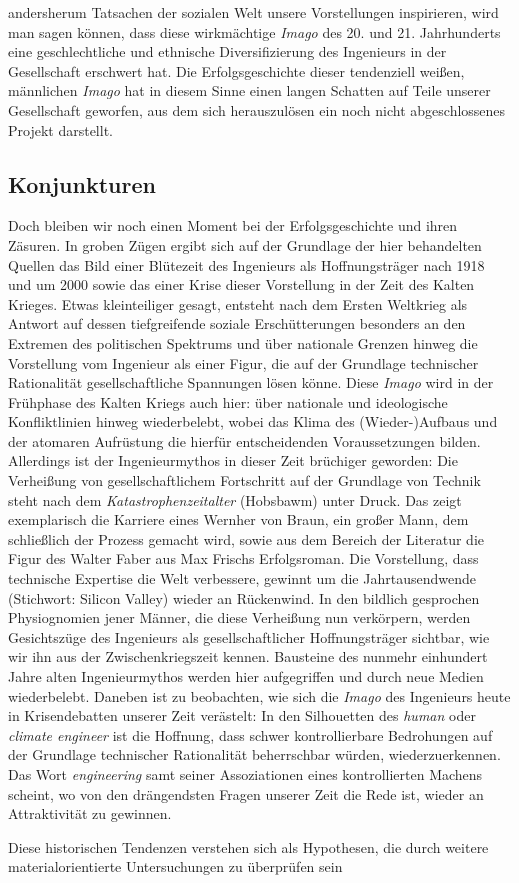\documentclass[%
	fontsize=10pt,%
	twoside,%
	headings=optiontoheadandtoc,%
	showtrims]{scrbook}
\renewcommand{\texttt}{\nohyphens} %
\begin{document}
andersherum Tatsachen der sozialen Welt unsere Vorstellungen inspirieren, wird man sagen können, dass diese wirkmächtige \emph{Imago} des 20. und 21. Jahrhunderts eine geschlechtliche und ethnische Diversifizierung des Ingenieurs in der Gesellschaft erschwert hat. Die Erfolgsgeschichte dieser tendenziell weißen, männlichen \emph{Imago} hat in diesem Sinne einen langen Schatten auf Teile unserer Gesellschaft geworfen, aus dem sich herauszulösen ein noch nicht abgeschlossenes Projekt darstellt.
\subsection[Konjunkturen]{Konjunkturen}
\par Doch bleiben wir noch einen Moment bei der Erfolgsgeschichte und ihren Zäsuren. In groben Zügen ergibt sich auf der Grundlage der hier behandelten Quellen das Bild einer Blütezeit des Ingenieurs als Hoffnungsträger nach 1918 und um 2000 sowie das einer Krise dieser Vorstellung in der Zeit des Kalten Krieges. Etwas kleinteiliger gesagt, entsteht nach dem Ersten Weltkrieg als Antwort auf dessen tiefgreifende soziale Erschütterungen besonders an den Extremen des politischen Spektrums und über nationale Grenzen hinweg die Vorstellung vom Ingenieur als einer Figur, die auf der Grundlage technischer Rationalität gesellschaftliche Spannungen lösen könne. Diese \emph{Imago} wird in der Frühphase des Kalten Kriegs \textendash{} auch hier: über nationale und ideologische Konfliktlinien hinweg \textendash{} wiederbelebt, wobei das Klima des \texttt{(Wieder-)Aufbaus} und der atomaren Aufrüstung die hierfür entscheidenden Voraussetzungen bilden. Allerdings ist der Ingenieurmythos in dieser Zeit brüchiger geworden: Die Verheißung von gesellschaftlichem Fortschritt auf der Grundlage von Technik steht nach dem \emph{Katastrophenzeitalter} (Hobsbawm) unter Druck. Das zeigt exemplarisch die Karriere eines Wernher von Braun, ein großer Mann, dem schließlich der Prozess gemacht wird, sowie aus dem Bereich der Literatur die Figur des Walter Faber aus Max Frischs Erfolgsroman. Die Vorstellung, dass technische Expertise die Welt verbessere, gewinnt um die Jahrtausendwende (Stichwort: Silicon Valley) wieder an Rückenwind. In den \textendash{} bildlich gesprochen \textendash{} Physiognomien jener Männer, die diese Verheißung nun verkörpern, werden Gesichtszüge des Ingenieurs als gesellschaftlicher Hoffnungsträger sichtbar, wie wir ihn aus der Zwischenkriegszeit kennen. Bausteine des nunmehr einhundert Jahre alten Ingenieurmythos werden hier aufgegriffen und durch neue Medien wiederbelebt. Daneben ist zu beobachten, wie sich die \emph{Imago} des Ingenieurs heute in Krisendebatten unserer Zeit verästelt: In den Silhouetten des \emph{human} oder \emph{climate engineer} ist die Hoffnung, dass schwer kontrollierbare Bedrohungen auf der Grundlage technischer Rationalität beherrschbar würden, wiederzuerkennen. Das Wort \emph{engineering} samt seiner Assoziationen eines kontrollierten Machens scheint, wo von den drängendsten Fragen unserer Zeit die Rede ist, wieder an Attraktivität zu gewinnen.\par Diese historischen Tendenzen verstehen sich als Hypothesen, die durch weitere materialorientierte Untersuchungen zu überprüfen sein 
\end{document}
